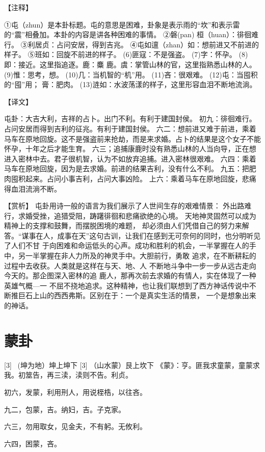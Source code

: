 \documentclass[12pt,UTF8]{ctexbook}
\begin{document}
【注释】

①屯（zhun）是本卦标题。屯的意思是困难，卦象是表示雨的“坎”和表示雷的“震”相叠加。本卦的内容是讲各种困难的事情。
②磐(pan) 桓（huan）：徘徊难行。
③利居贞：占问安居，得到吉兆。
④屯如邅（zhan）如：想前进又不前进的样子。
⑤班如：回旋不前进的样子。
(6)匪寇：不是强盗。
(7)字：怀孕。
(8)即：接近。这里指追逐。鹿：麋 鹿。虞：掌管山林的官，这里指熟悉山林的人。
(9)惟：思考，想。
(10)几：当机智的“机”用。
(11)吝：很艰难。
(12)屯：当囤积的“囤”用； 膏：肥肉。
(13)涟如：水波荡漾的样子，这里形容血泪不断地流淌。

【译文】

屯卦：大吉大利，吉祥的占卜。出门不利。有利于建国封侯。
初九：徘徊难行。占问安居而得到吉利的征兆。有利于建国封侯。
六二：想前进又难于前进，乘着马车在原地回旋。这不是强盗前来抢劫，而是来求婚。占卜的结果是这个女子不能怀孕，十年之后才能生育。
六三；追捕康鹿时没有熟悉山林的人当向导，正在想进入密林中去。君子很机智，认为不如放弃追捕。进入密林很艰难。
六四：乘着马车在原地回旋，因为是去求婚。前进的结果吉利，没有什么不利。
九五：把肥肉囤积起来。占问小事吉利，占问大事凶险。
上六：乘着马车在原地回旋，悲痛得血泪流淌不断。

【赏析】
屯卦用诗一般的语言为我们展示了人世间生存的艰难情景： 外出路难行，求婚受挫，追猎受阻，踌躇徘徊和悲痛欲绝的心境。 天地神灵固然可以成为精神上的支撑和鼓舞，而摆脱困境的难题， 却必须由人们凭借自己的努力来解答。“谋事在人，成事在天”这句古训，让我们在感到无可奈何的同时，也分明听见了人们不甘 于向困难和命运低头的心声。成功和胜利的机会，一半掌握在人的手中，另一半掌握在非人力所及的神灵手中。大胆前行，勇敢 追求，在不断耕耘的过程中去收获。人类就是这样在与天、地、人 不断地斗争中一步一步从远古走向今天的。那企图深入密林的追 鹿人，那再次前去求婚的有情人，实在体现了一种英雄气概—一 不屈不挠地追求。这种精神，也让我们联想到了西方神话传说中不断推巨石上山的西西弗斯。区别在于：一个是真实生活的情景， 一个是想象出来的神话。 

\chapter{蒙卦}

[3] \ (坤为地）坤上坤下
[3]
（山水蒙）艮上坎下
《蒙》：亨。匪我求童蒙，童蒙求我。初筮告，再三渎，渎则不告。利贞。

初六，发蒙，利用刑人，用说桎梏，以往吝。

九二，包蒙，吉。纳妇，吉。子克家。

六三，勿用取女，见金夫，不有躬。无攸利。

六四，困蒙，吝。
\end{document}
